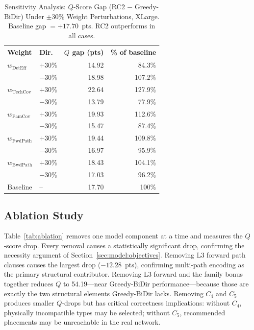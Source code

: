 \documentclass[journal]{IEEEtran}
\newcommand{\qscore}{$Q$-score}
\begin{document}
\begin{table}[!htb]
\caption{Sensitivity Analysis: $Q$-Score Gap (RC2 $-$ Greedy-BiDir)
  Under $\pm30\%$ Weight Perturbations, XLarge.
  Baseline gap $=+17.70$~pts. RC2 outperforms in all cases.}
\label{tab:sensitivity}
\centering
\renewcommand{\arraystretch}{1.2}
\begin{tabular}{llrr}
\toprule
Weight & Dir. & $Q$ gap (pts) & \% of baseline \\
\midrule
$w_{\mathrm{DetEff}}$  & $+30\%$ & 14.92 & 84.3\% \\
                        & $-30\%$ & 18.98 & 107.2\% \\
$w_{\mathrm{TechCov}}$ & $+30\%$ & 22.64 & 127.9\% \\
                        & $-30\%$ & 13.79 & 77.9\% \\
$w_{\mathrm{FamCov}}$  & $+30\%$ & 19.93 & 112.6\% \\
                        & $-30\%$ & 15.47 & 87.4\% \\
$w_{\mathrm{FwdPath}}$ & $+30\%$ & 19.44 & 109.8\% \\
                        & $-30\%$ & 16.97 & 95.9\% \\
$w_{\mathrm{BwdPath}}$ & $+30\%$ & 18.43 & 104.1\% \\
                        & $-30\%$ & 17.03 & 96.2\% \\
\midrule
Baseline & -- & 17.70 & 100\% \\
\bottomrule
\end{tabular}
\end{table}

\subsection{Ablation Study}
\label{sec:results:ablation}

Table~\ref{tab:ablation} removes one model component at a time and
measures the \qscore{} drop. Every removal causes a statistically
significant drop, confirming the necessity argument of
Section~\ref{sec:model:objectives}. Removing L3 forward path clauses
causes the largest drop ($-12.28$~pts), confirming multi-path
encoding as the primary structural contributor. Removing L3 forward
and the family bonus together reduces $Q$ to 54.19---near
Greedy-BiDir performance---because those are exactly the two
structural elements Greedy-BiDir lacks. Removing $C_4$ and $C_5$
produces smaller $Q$-drops but has critical correctness implications:
without $C_4$, physically incompatible types may be selected;
without $C_5$, recommended placements may be unreachable in the
real network.
\end{document}
